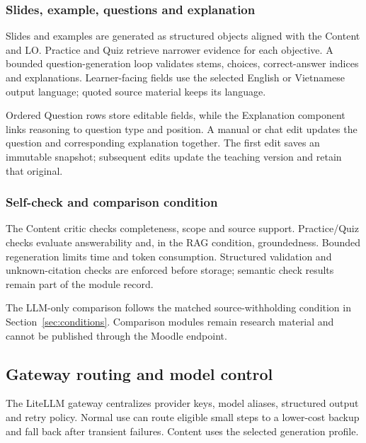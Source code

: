 \subsubsection{Slides, example, questions and explanation}
Slides and examples are generated as structured objects aligned with the Content and LO. Practice and Quiz retrieve narrower evidence for each objective. A bounded question-generation loop validates stems, choices, correct-answer indices and explanations. Learner-facing fields use the selected English or Vietnamese output language; quoted source material keeps its language.

Ordered Question rows store editable fields, while the Explanation component links reasoning to question type and position. A manual or chat edit updates the question and corresponding explanation together. The first edit saves an immutable  snapshot; subsequent edits update the teaching version and retain that original.
\subsubsection{Self-check and comparison condition}
The Content critic checks completeness, scope and source support. Practice/Quiz checks evaluate answerability and, in the RAG condition, groundedness. Bounded regeneration limits time and token consumption. Structured validation and unknown-citation checks are enforced before storage; semantic check results remain part of the module record.

The LLM-only comparison follows the matched source-withholding condition in Section~\ref{sec:conditions}. Comparison modules remain research material and cannot be published through the Moodle endpoint.
\subsection{Gateway routing and model control}
The LiteLLM gateway centralizes provider keys, model aliases, structured output and retry policy\citep{litellm}. Normal use can route eligible small steps to a lower-cost backup and fall back after transient failures. Content uses the selected generation profile.

